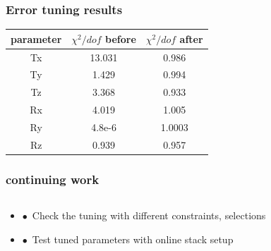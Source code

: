 \documentclass[aspectratio=1610, 12pt]{beamer}
\begin{document}
\begin{frame}\frametitle{Error tuning results}
  \begin{table}
    \centering
    \begin{tabular}{c | c c}
      \hline
      parameter & $\chi^2 / dof$ before & $\chi^2 / dof$ after \\
      \hline
      Tx & 13.031 & 0.986\\
      Ty & 1.429 & 0.994 \\
      Tz & 3.368 & 0.933 \\
      Rx & 4.019 & 1.005 \\
      Ry & 4.8e-6 & 1.0003 \\
      Rz & 0.939 & 0.957 \\
      \hline
    \end{tabular}
  \end{table}
\end{frame}

\begin{frame}\frametitle{continuing work}
  \begin{columns}
    \begin{column}[c]{0.90\textwidth}
      \begin{itemize}
        \item $\bullet$\, Check the tuning with different constraints, selections
        \item $\bullet$\, Test tuned parameters with online stack setup
      \end{itemize}
    \end{column}
  \end{columns}
\end{frame}
\end{document}
